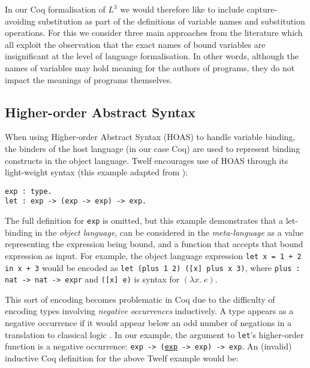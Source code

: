 \documentclass[]{unswthesis}
\let\c\texttt
\begin{document}

In our Coq formalisation of $L^3$ we would therefore like to include capture-avoiding substitution as part of the definitions of variable names and substitution operations. For this we consider three main approaches from the literature which all exploit the observation that the exact names of bound variables are insignificant at the level of language formalisation. In other words, although the names of variables may hold meaning for the authors of programs, they do not impact the meanings of programs themselves.

\subsection{Higher-order Abstract Syntax}

When using Higher-order Abstract Syntax (HOAS) to handle variable binding, the binders of the host language (in our case Coq) are used to represent binding constructs in the object language. Twelf encourages use of HOAS through its light-weight syntax (this example adapted from \cite{twelf08}):

\begin{verbatim}
exp : type.
let : exp -> (exp -> exp) -> exp.
\end{verbatim}

The full definition for \c{exp} is omitted, but this example demonstrates that a let-binding in the \textit{object language}, can be considered in the \textit{meta-language} as a value representing the expression being bound, and a function that accepts that bound expression as input. For example, the object language expression \c{let x = 1 + 2 in x + 3} would be encoded as \c{let (plus 1 2) ([x] plus x 3)}, where \c{plus : nat -> nat -> expr} and \c{([x] e)} is syntax for $(\lambda x. \; e)$.

This sort of encoding becomes problematic in Coq due to the difficulty of encoding types involving \textit{negative occurrences} inductively. A type appears as a negative occurrence if it would appear below an odd number of negations in a translation to classical logic \cite{tapl}. In our example, the argument to \c{let}'s higher-order function is a negative occurrence: \c{exp -> (\underline{exp} -> exp) -> exp}. An (invalid) inductive Coq definition for the above Twelf example would be:
\end{document}
